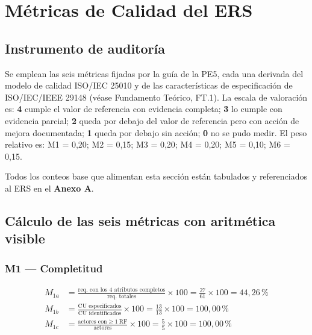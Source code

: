 \documentclass[11pt]{article}
\begin{document}
	\newpage
	
	\section{Métricas de Calidad del ERS}
	
	\subsection{Instrumento de auditoría}
	
	Se emplean las seis métricas fijadas por la guía de la PE5, cada una derivada del modelo de calidad ISO/IEC 25010 y de las características de especificación de ISO/IEC/IEEE 29148 (véase Fundamento Teórico, FT.1). La escala de valoración es: \textbf{4} cumple el valor de referencia con evidencia completa; \textbf{3} lo cumple con evidencia parcial; \textbf{2} queda por debajo del valor de referencia pero con acción de mejora documentada; \textbf{1} queda por debajo sin acción; \textbf{0} no se pudo medir. El peso relativo es: M1 = 0,20; M2 = 0,15; M3 = 0,20; M4 = 0,20; M5 = 0,10; M6 = 0,15.
	
	Todos los conteos base que alimentan esta sección están tabulados y referenciados al ERS en el \textbf{Anexo A}.
	
	\subsection{Cálculo de las seis métricas con aritmética visible}
	
	\subsubsection*{M1 --- Completitud}
	
	{\setlength{\jot}{8pt}
		\begin{align*}
			M_{1a} &= \frac{\text{req. con los 4 atributos completos}}{\text{req. totales}} \times 100 = \frac{27}{61} \times 100 = 44{,}26\,\% \\
			M_{1b} &= \frac{\text{CU especificados}}{\text{CU identificados}} \times 100 = \frac{13}{13} \times 100 = 100{,}00\,\% \\
			M_{1c} &= \frac{\text{actores con} \geq 1\ \text{RF}}{\text{actores}} \times 100 = \frac{5}{5} \times 100 = 100{,}00\,\%
	\end{align*}}
	
\end{document}
